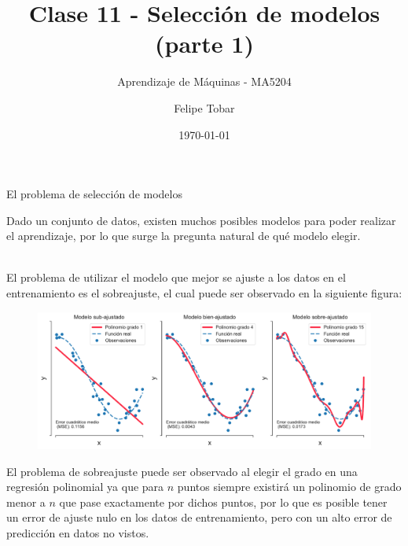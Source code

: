 \documentclass[9pt]{beamer}
\title{Clase 11 - Selección de modelos (parte 1)}
\subtitle{Aprendizaje de Máquinas - MA5204}
\date{\today}
\author{Felipe Tobar}
\institute{Department of Mathematical Engineering \&\\ Center for Mathematical Modelling\\Universidad de Chile}
\begin{document}
\begin{frame}
  \titlepage
\end{frame}

\begin{frame}{El problema de selección de modelos}

Dado un conjunto de datos, existen muchos posibles modelos para poder realizar el aprendizaje, por lo que surge la pregunta natural de qué modelo elegir. \\~\ \pause

El problema de utilizar el modelo que mejor se ajuste a los datos en el entrenamiento es el sobreajuste, el cual puede ser observado en la siguiente figura:
\begin{figure}[h!]
    \centering
    \includegraphics[width = 0.8\linewidth]{../img/cap4_ajuste.pdf}
\end{figure}\pause

El problema de sobreajuste puede ser observado al elegir el grado en una regresión polinomial ya que para $n$ puntos siempre existirá un polinomio de grado menor a $n$ que pase exactamente por dichos puntos, por lo que es posible tener un error de ajuste nulo en los datos de entrenamiento, pero con un alto error de predicción en datos no vistos.

\end{frame}
\end{document}
